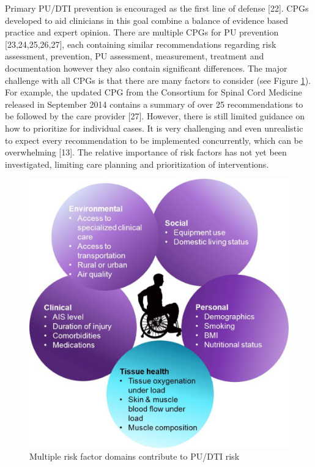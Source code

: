\documentclass{amia}
\begin{document}
Primary PU/DTI prevention is encouraged as the first line of defense [22]. CPGs developed to aid clinicians in this goal combine a balance of evidence based practice and expert opinion. There are multiple CPGs for PU prevention [23,24,25,26,27], each containing similar recommendations regarding risk assessment, prevention, PU assessment, measurement, treatment and documentation however they also contain significant differences. The major challenge with all CPGs is that there are many factors to consider (see Figure \ref{risk_factors}). For example, the updated CPG from the Consortium for Spinal Cord Medicine released in September 2014 contains a summary of over 25 recommendations to be followed by the care provider [27]. However, there is still limited guidance on how to prioritize for individual cases. It is very challenging and even unrealistic to expect every recommendation to be implemented concurrently, which can be overwhelming [13]. The relative importance of risk factors has not yet been investigated, limiting care planning and prioritization of interventions.

\begin{figure}
  \begin{center}
    \includegraphics[scale=0.5]{pics/risk_factors.png}
  \end{center}
  \caption{Multiple risk factor domains contribute to PU/DTI risk}
  \label{risk_factors}
\end{figure}
\end{document}
